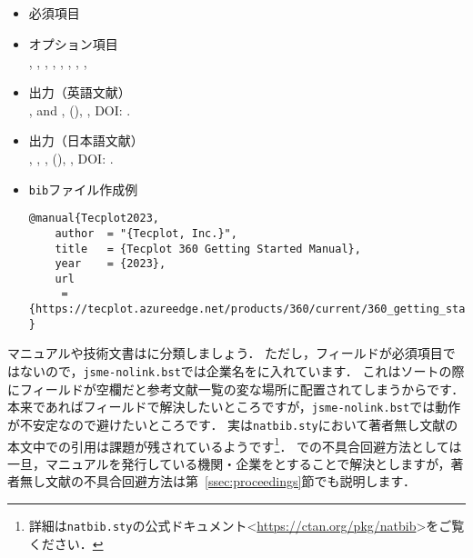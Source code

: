 \documentclass[a4paper,fleqn,uplatex,dvipdfmx]{jsarticle}
\newcommand{\jsmefile}{\texttt{jsme-nolink.bst}}
\begin{document}
\subsection{\ttmanual}
\label{ssec:manual}
\begin{tcolorbox}[enhanced, title=\ttmanual, drop fuzzy shadow]
    \begin{itemize}
        \item 必須項目 \\
        \tttitle
        \item オプション項目 \\
        \ttauthor, \ttorganization, \ttaddress, \ttedition, \ttmonth, \ttyear, \ttnote, \ttkey, \ttdoi
        \item 出力（英語文献） \\
            \colorbox[gray]{0.8}{\ttauthorf}, \colorbox[gray]{0.8}{\ttauthors} and \colorbox[gray]{0.8}{\ttauthort}, \colorbox[gray]{0.8}{\tttitle} (\colorbox[gray]{0.8}{\ttyear}), \colorbox[gray]{0.8}{\ttnote}, DOI: \colorbox[gray]{0.8}{\ttdoi}.
        \item 出力（日本語文献） \\
            \colorbox[gray]{0.8}{\ttauthorf}, \colorbox[gray]{0.8}{\ttauthors}, \colorbox[gray]{0.8}{\ttauthort}, \colorbox[gray]{0.8}{\tttitle} (\colorbox[gray]{0.8}{\ttyear}), \colorbox[gray]{0.8}{\ttnote}, DOI: \colorbox[gray]{0.8}{\ttdoi}.
        \item \verb|bib|ファイル作成例 \vspace{-3mm}
\begin{verbatim}
@manual{Tecplot2023,
    author  = "{Tecplot, Inc.}",
    title   = {Tecplot 360 Getting Started Manual},
    year    = {2023},
    url    
     = {https://tecplot.azureedge.net/products/360/current/360_getting_started.pdf}
}
\end{verbatim}
    \end{itemize}
\end{tcolorbox}

マニュアルや技術文書は\ttmanual に分類しましょう．
ただし，\ttauthor フィールドが必須項目ではないので，\jsmefile では企業名を\ttauthor に入れています．
これはソートの際に\ttauthor フィールドが空欄だと参考文献一覧の変な場所に配置されてしまうからです．
本来であれば\ttkey フィールドで解決したいところですが，\jsmefile では動作が不安定なので避けたいところです．
実は\verb|natbib.sty|において著者無し文献の本文中での引用は課題が残されているようです\footnote{詳細は\verb|natbib.sty|の公式ドキュメント\textless\url{https://ctan.org/pkg/natbib}\textgreater をご覧ください．}．
\ttmanual での不具合回避方法としては一旦，マニュアルを発行している機関・企業を\ttauthor とすることで解決としますが，著者無し文献の不具合回避方法は第~\ref{ssec:proceedings}節\ttproceedings でも説明します．
\end{document}
